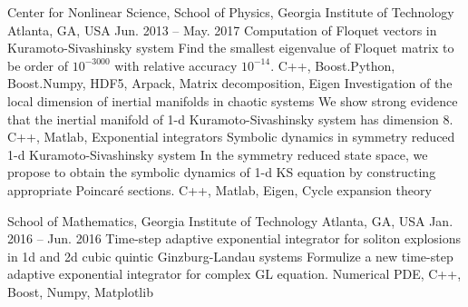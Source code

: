 


\begin{cventries}
  \cvresearch
  {Center for Nonlinear Science, School of Physics, Georgia Institute of Technology}
  {Atlanta, GA, USA}
  {Jun. 2013 -- May. 2017}
  {
    \cvresearchitem
    {Computation of Floquet vectors in Kuramoto-Sivashinsky system}
    {Find the smallest eigenvalue of Floquet matrix to be order of $10^{-3000}$ with relative accuracy $10^{-14}$.}
    {C++, Boost.Python, Boost.Numpy, HDF5, Arpack, Matrix decomposition, Eigen}
    \cvresearchitem
    {Investigation of the local dimension of inertial manifolds in chaotic systems}
    {We show strong evidence that the inertial manifold of 1-d Kuramoto-Sivashinsky system has dimension 8.}
    {C++, Matlab, Exponential integrators}
    \cvresearchitem
    {Symbolic dynamics in symmetry reduced 1-d Kuramoto-Sivashinsky system}
    {In the symmetry reduced state space, we propose to obtain the symbolic dynamics of 1-d KS equation by constructing appropriate Poincar\'e sections.}
    {C++, Matlab, Eigen, Cycle expansion theory}
  }

  \cvresearch
  {School of Mathematics, Georgia Institute of Technology} 
  {Atlanta, GA, USA}
  {Jan. 2016 -- Jun. 2016} 
  {
    \cvresearchitem
    {Time-step adaptive exponential integrator for soliton explosions in 1d and 2d cubic quintic Ginzburg-Landau systems}
    {Formulize a new time-step adaptive exponential integrator for complex GL equation.}
    {Numerical PDE, C++, Boost, Numpy, Matplotlib}
  }


\end{cventries}

